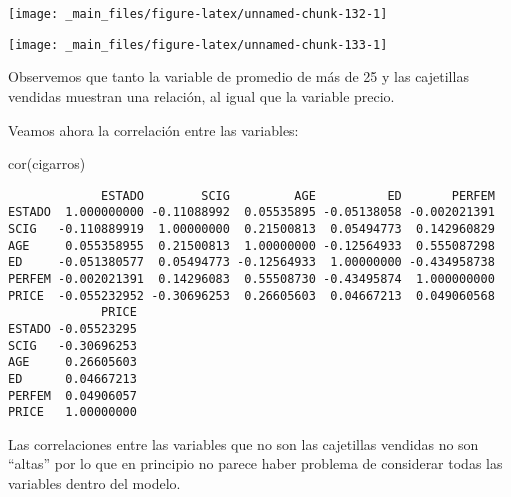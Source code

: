 \documentclass[
  a4paper,
  oneside,
  openany]{book}
\newenvironment{Shaded}{\begin{snugshade}}{\end{snugshade}}
\newcommand{\AttributeTok}[1]{\textcolor[rgb]{0.77,0.63,0.00}{#1}}
\newcommand{\DecValTok}[1]{\textcolor[rgb]{0.00,0.00,0.81}{#1}}
\newcommand{\FunctionTok}[1]{\textcolor[rgb]{0.00,0.00,0.00}{#1}}
\newcommand{\NormalTok}[1]{#1}
\newcommand{\SpecialCharTok}[1]{\textcolor[rgb]{0.00,0.00,0.00}{#1}}
\newcommand{\StringTok}[1]{\textcolor[rgb]{0.31,0.60,0.02}{#1}}
\begin{document}
\begin{center}\texttt{[image: \_main\_files/figure-latex/unnamed-chunk-132-1]} \end{center}

\begin{Shaded}
\end{Shaded}

\begin{center}\texttt{[image: \_main\_files/figure-latex/unnamed-chunk-133-1]} \end{center}

Observemos que tanto la variable de promedio de más de 25 y las cajetillas vendidas muestran una relación, al igual que la variable precio.

Veamos ahora la correlación entre las variables:

\begin{Shaded}
\begin{Highlighting}[]
\FunctionTok{cor}\NormalTok{(cigarros)}
\end{Highlighting}
\end{Shaded}

\begin{verbatim}
             ESTADO        SCIG         AGE          ED       PERFEM
ESTADO  1.000000000 -0.11088992  0.05535895 -0.05138058 -0.002021391
SCIG   -0.110889919  1.00000000  0.21500813  0.05494773  0.142960829
AGE     0.055358955  0.21500813  1.00000000 -0.12564933  0.555087298
ED     -0.051380577  0.05494773 -0.12564933  1.00000000 -0.434958738
PERFEM -0.002021391  0.14296083  0.55508730 -0.43495874  1.000000000
PRICE  -0.055232952 -0.30696253  0.26605603  0.04667213  0.049060568
             PRICE
ESTADO -0.05523295
SCIG   -0.30696253
AGE     0.26605603
ED      0.04667213
PERFEM  0.04906057
PRICE   1.00000000
\end{verbatim}

Las correlaciones entre las variables que no son las cajetillas vendidas no son ``altas'' por lo que en principio no parece haber problema de considerar todas las variables dentro del modelo.
\end{document}
